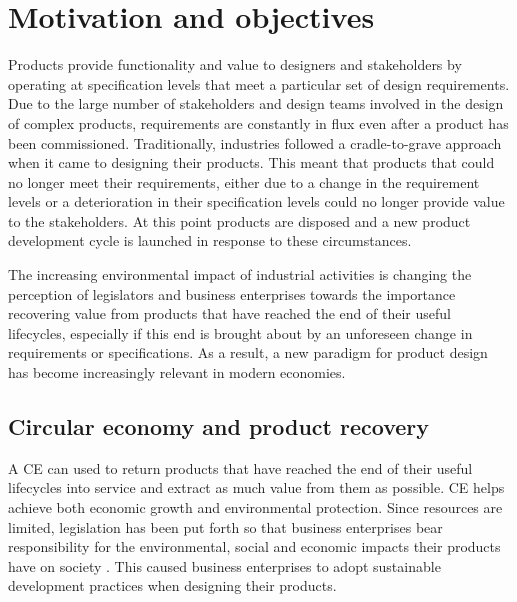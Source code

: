 \section{Motivation and objectives}
\label{sec:motivation}

Products provide functionality and value to designers and stakeholders by operating at specification levels that meet a particular set of design requirements. Due to the large number of stakeholders and design teams involved in the design of complex products, requirements are constantly in flux even after a product has been commissioned. Traditionally, industries followed a cradle-to-grave approach when it came to designing their products. This meant that products that could no longer meet their requirements, either due to a change in the requirement levels or a deterioration in their specification levels could no longer provide value to the stakeholders. At this point products are disposed and a new product development cycle is launched in response to these circumstances.

The increasing environmental impact of industrial activities is changing the perception of legislators and business enterprises towards the importance recovering value from products that have reached the end of their useful lifecycles, especially if this end is brought about by an unforeseen change in requirements or specifications. As a result, a new paradigm for product design has become increasingly relevant in modern economies.

\subsection{Circular economy and product recovery} \label{subsec:CE}

A \ac{CE} can used to return products that have reached the end of their useful lifecycles into service and extract as much value from them as possible. \ac{CE} helps achieve both economic growth and environmental protection. Since resources are limited, legislation has been put forth so that business enterprises bear responsibility for the environmental, social and economic impacts their products have on society \cite{Matos2007}. This caused business enterprises to adopt sustainable development practices when designing their products.

